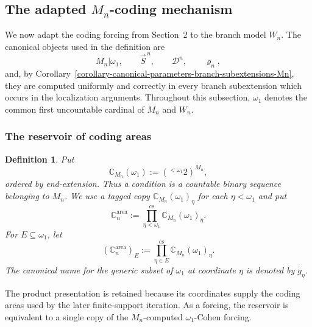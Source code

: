 \documentclass[a4paper,11pt]{article}
\newtheorem{definition}[theorem]{Definition}
\newcommand{\forceC}{\mathbb{C}}
\begin{document}
\subsection[The adapted Mn-coding mechanism]{The adapted $M_n$-coding mechanism}
\label{subsection-adapted-Mn-coding-mechanism}

We now adapt the coding forcing from Section~2 to the branch model $W_n$.
The canonical objects used in the definition are
\[
   M_n|\omega_1,
   \qquad
   \vec S^{\,n},
   \qquad
   \mathcal D^n,
   \qquad
   \varrho_n,
\]
and, by
Corollary~\ref{corollary-canonical-parameters-branch-subextensions-Mn},
they are computed uniformly and correctly in every branch subextension which
occurs in the localization arguments.  Throughout this subsection,
$\omega_1$ denotes the common first uncountable cardinal of $M_n$ and $W_n$.

\subsubsection*{The reservoir of coding areas}

\begin{definition}
\label{definition-Mn-Cohen-reservoir}
Put
\[
   \mathbb C_{M_n}(\omega_1)
   :=({}^{<\omega_1}2)^{M_n},
\]
ordered by end-extension.  Thus a condition is a countable binary sequence
belonging to $M_n$.  We use a tagged copy
$\mathbb C_{M_n}(\omega_1)_\eta$ for each $\eta<\omega_1$ and put
\[
   \forceC^{\mathrm{area}}_n
   :=\prod_{\eta<\omega_1}^{\mathrm{cs}}
      \mathbb C_{M_n}(\omega_1)_\eta.
\]
For $E\subseteq\omega_1$, let
\[
   (\forceC^{\mathrm{area}}_n)_E
   :=\prod_{\eta\in E}^{\mathrm{cs}}
      \mathbb C_{M_n}(\omega_1)_\eta.
\]
The canonical name for the generic subset of $\omega_1$ at coordinate
$\eta$ is denoted by $\dot g_\eta$.
\end{definition}

The product presentation is retained because its coordinates supply the
coding areas used by the later finite-support iteration.  As a forcing, the
reservoir is equivalent to a single copy of the $M_n$-computed
$\omega_1$-Cohen forcing.
\end{document}
